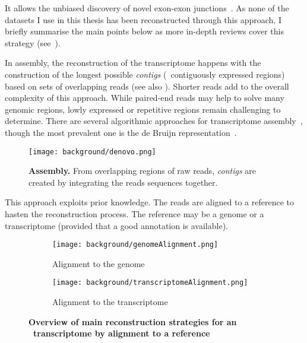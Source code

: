 It allows the unbiased discovery of novel
exon-exon junctions~. As none of the datasets I use in this
thesis has been reconstructed through this approach, I briefly summarise
the main points below as more in-depth reviews cover this strategy
(see~\cite{denovoReview}).\mybr\

In  assembly, the reconstruction of the transcriptome happens
with the construction of the longest possible \emph{contigs} (\ie\ contiguously
expressed regions) based on sets of overlapping reads (see also
). Shorter reads add
to the overall complexity of this approach. While paired-end reads may help to
solve many genomic regions, lowly expressed or repetitive regions remain
challenging to determine. There are several algorithmic approaches for  transcriptome assembly~,
though the most prevalent one is the de Bruijn representation~.\mybr\

\begin{figure}[!htb]
    \texttt{[image: background/denovo.png]}\centering
    \caption[\textit{de novo} Assembly]{\label{fig:denovo}\textbf{
    Assembly.} From overlapping regions of raw reads, \emph{contigs} are
    created by integrating the reads sequences together.}
\end{figure}

This approach exploits prior knowledge. The reads are aligned to a reference to
hasten the reconstruction process. The reference may be a genome or a
transcriptome (provided that a good annotation is available).\mybr\

\begin{figure}[!htb]
    \centering
    \begin{subfigure}{1.1\textwidth}\label{fig:genoAlignment}
        \texttt{[image: background/genomeAlignment.png]}\centering
        \caption{Alignment to the genome}
    \end{subfigure}

    \begin{subfigure}{1.1\textwidth}\label{fig:transAlignment}
        \texttt{[image: background/transcriptomeAlignment.png]}\centering
        \caption{Alignment to the transcriptome}
    \end{subfigure}
    \caption[Overview of main alignment strategies for \Rnaseq\
    transcriptome]{\label{fig:OverviewRnaseqMapping}\textbf{Overview of main
    reconstruction strategies for an \Rnaseq\ transcriptome by alignment to a
    reference}}
\end{figure}

